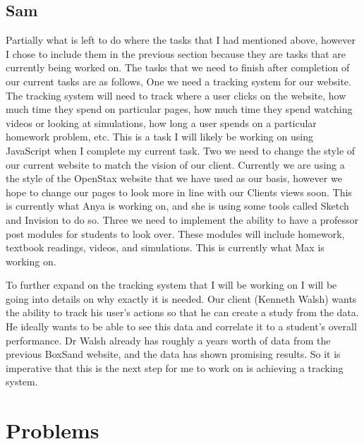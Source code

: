 \documentclass[onecolumn, draftclsnofoot,10pt, compsoc]{IEEEtran}
\begin{document}
\subsection{Sam}
Partially what is left to do where the tasks that I had mentioned above, however I chose to include them in the previous section because they are tasks that are currently being worked on. The tasks that we need to finish after completion of our current tasks are as follows, One we need a tracking system for our website. The tracking system will need to track where a user clicks on the website, how much time they spend on particular pages, how much time they spend watching videos or looking at simulations, how long a user spends on a particular homework problem, etc. This is a task I will likely be working on using JavaScript when I complete my current task. Two we need to change the style of our current website to match the vision of our client. Currently we are using a the style of the OpenStax website that we have used as our basis, however we hope to change our pages to look more in line with our Clients views soon. This is currently what Anya is working on, and she is using some tools called Sketch and Invision to do so. Three we need to implement the ability to have a professor post modules for students to look over. These modules will include homework, textbook readings, videos, and simulations. This is currently what Max is working on. 

To further expand on the tracking system that I will be working on I will be going into details on why exactly it is needed. Our client (Kenneth Walsh) wants the ability to track his user’s actions so that he can create a study from the data. He ideally wants to be able to see this data and correlate it to a student’s overall performance. Dr Walsh already has roughly a years worth of data from the previous BoxSand website, and the data has shown promising results. So it is imperative that this is the next step for me to work on is achieving a tracking system. 



\section{Problems}
\end{document}
